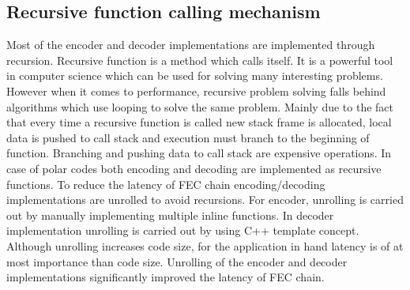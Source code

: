 \subsection{Recursive function calling mechanism}
Most of the encoder and decoder implementations are implemented through recursion. Recursive function is a method which calls itself. It is a powerful tool in computer science which can be used for solving many interesting problems. However when it comes to performance, recursive problem solving falls behind algorithms which use looping to solve the same problem. Mainly due to the fact that every time a recursive function is called new stack frame is allocated, local data is pushed to call stack and execution must branch to the beginning of function. Branching and pushing data to call stack are expensive operations. In case of polar codes both encoding and decoding are implemented as recursive functions. To reduce the latency of FEC chain encoding/decoding implementations are unrolled to avoid recursions. For encoder, unrolling is carried out by manually implementing multiple inline functions. In decoder implementation unrolling is carried out by using C++ template concept. Although unrolling increases code size, for the application in hand latency is of at most importance than code size. Unrolling of the encoder and decoder implementations significantly improved the latency of FEC chain.